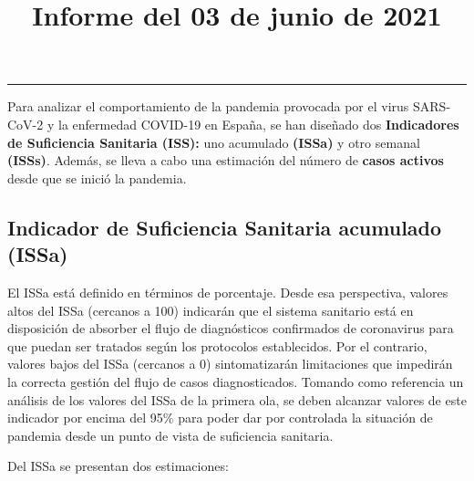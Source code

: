\documentclass[
  11pt,
]{article}
\title{Informe del 03 de junio de 2021}
\author{}
\date{\vspace{-2.5em}}
\begin{document}
\maketitle

\renewcommand{\figurename}{Figura}
\renewcommand{\tablename}{Tabla}

\tableofcontents

\vspace{.5cm}

\begin{center}\rule{0.5\linewidth}{0.5pt}\end{center}

\vspace{.5cm}

Para analizar el comportamiento de la pandemia provocada por el virus
SARS-CoV-2 y la enfermedad COVID-19 en España, se han diseñado dos
\textbf{Indicadores de Suficiencia Sanitaria (ISS):} uno acumulado
\textbf{(ISSa)} y otro semanal \textbf{(ISSs)}. Además, se lleva a cabo
una estimación del número de \textbf{casos activos} desde que se inició
la pandemia.

\hypertarget{indicador-de-suficiencia-sanitaria-acumulado-issa}{%
\subsection{Indicador de Suficiencia Sanitaria acumulado
(ISSa)}\label{indicador-de-suficiencia-sanitaria-acumulado-issa}}

El ISSa está definido en términos de porcentaje. Desde esa perspectiva,
valores altos del ISSa (cercanos a 100) indicarán que el sistema
sanitario está en disposición de absorber el flujo de diagnósticos
confirmados de coronavirus para que puedan ser tratados según los
protocolos establecidos. Por el contrario, valores bajos del ISSa
(cercanos a 0) sintomatizarán limitaciones que impedirán la correcta
gestión del flujo de casos diagnosticados. Tomando como referencia un
análisis de los valores del ISSa de la primera ola, se deben alcanzar
valores de este indicador por encima del 95\% para poder dar por
controlada la situación de pandemia desde un punto de vista de
suficiencia sanitaria.

Del ISSa se presentan dos estimaciones:
\end{document}
